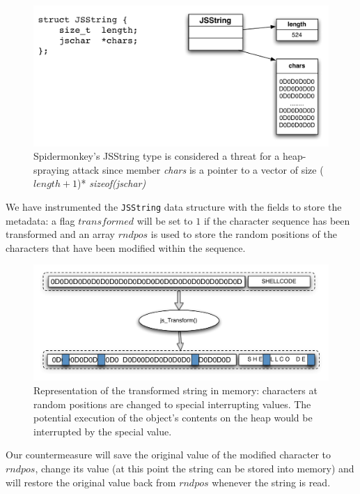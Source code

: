 \begin{figure}[htbp]
\begin{center}
\includegraphics[scale=0.4]{images/jsstring.pdf}
\caption{{Spidermonkey's JSString type is considered a threat for a heap-spraying attack since member \emph{chars} is a pointer to a vector of size ($length+1$)* \emph{sizeof(jschar)} }}
\label{jsstring}
\end{center}
\end{figure}

We have instrumented the \texttt{JSString} data structure with the fields to store the metadata: a flag $transformed$ will be set to $1$ if the character sequence has been transformed and an array $rndpos$ is used to store the random positions of the characters that have been modified within the sequence.

\begin{figure}[htbp]
\begin{center}
\includegraphics[scale=0.5]{images/stringint}
\caption{{Representation of the transformed string in memory: characters at random positions are changed to special interrupting values. The potential execution of the object's contents on the heap would be interrupted by the special value.}}
\label{stringrepr}
\end{center}
\end{figure}

Our countermeasure will save the original value of the modified character to $rndpos$, change its value (at this point the string can be stored into memory) and will restore the original value back from $rndpos$ whenever the string is read.

